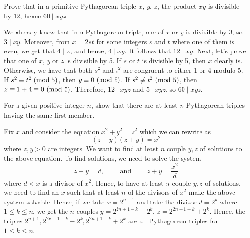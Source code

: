 \begin{exercise}
    Prove that in a primitive Pythagorean triple $x$, $y$, $z$, the product $xy$ is divisible by 12, hence $60 \mid xyz$. \\
\end{exercise}

\begin{solution}
    We already know that in a Pythagorean triple, one of $x$ or $y$ is divisible by 3, so $3\mid xy$. Moreover, from $x = 2st$ for some integers $s$ and $t$ where one of them is even, we get that $4 \mid x$, and hence, $4 \mid xy$. It follows that $12 \mid xy$. Next, let's prove that one of $x$, $y$ or $z$ is divisible by 5. If $s$ or $t$ is divisible by 5, then $x$ clearly is. Otherwise, we have that both $s^2$ and $t^2$ are congruent to either 1 or 4 modulo 5. If $s^2 \equiv t^2 \ (\mathrm{mod}\ 5)$, then $y \equiv 0 \ (\mathrm{mod}\ 5)$. If $s^2 \not\equiv t^2 \ (\mathrm{mod}\ 5)$, then $z \equiv 1 + 4 \equiv 0 \ (\mathrm{mod}\ 5)$. Therefore, $12\mid xyz$ and $5 \mid xyz$, so $60 \mid xyz$. \\
\end{solution}

\begin{exercise}
    For a given positive integer $n$, show that there are at least $n$ Pythagorean triples having the same first member.  \\
\end{exercise}

\begin{solution}
    Fix $x$ and consider the equation $x^2 + y^2 = z^2$ which we can rewrite as
    $$(z-y)(z+y) = x^2$$
    where $z,y > 0$ are integers. We want to find at least $n$ couple $y,z$ of solutions to the above equation. To find solutions, we need to solve the system
    $$z-y = d, \qquad \text{ and } \qquad z + y = \frac{x^2}{d}$$
    where $d < x$ is a divisor of $x^2$. Hence, to have at least $n$ couple $y,z$ of solutions, we need to find an $x$ such that at least $n$ of the divisors of $x^2$ make the above system solvable. Hence, if we take $x = 2^{n+1}$ and take the divisor $d = 2^k$ where $1 \leq k \leq n$, we get the $n$ couples $y = 2^{2n + 1 - k} - 2^k$, $z = 2^{2n + 1 - k} + 2^k$. Hence, the triples $2^{n+1}, 2^{2n + 1 - k} - 2^k, 2^{2n + 1 - k} + 2^k$ are all Pythagorean triples for $1 \leq k \leq n$. \\
\end{solution}


